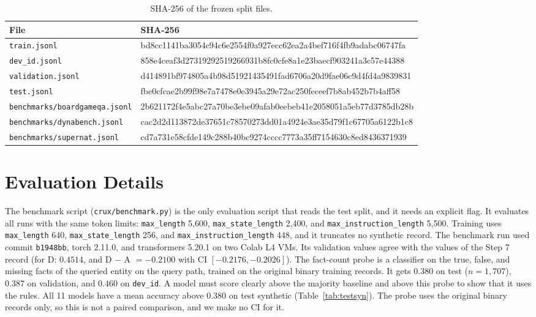 \documentclass[11pt,a4paper]{article}
\newcommand{\hash}[1]{{\ttfamily\scriptsize #1}}
\begin{document}
\begin{table}[h]
\centering
\caption{SHA-256 of the frozen split files.}\label{tab:hash}
\begin{tabular}{ll}
\toprule
File & SHA-256 \\
\midrule
\texttt{train.jsonl} & \hash{bd8cc1141ba3054c94c6e2554f0a927ecc62ea2a4bef716f4fb9adabc06747fa} \\
\texttt{dev\_id.jsonl} & \hash{858e4ceaf3d27319292519266931b8fc0cfe8a1e23baecf903241a3c57e44388} \\
\texttt{validation.jsonl} & \hash{d414891bf974805a4b98d51921435491fad6706a20d9fae06c9d4fd4a9839831} \\
\texttt{test.jsonl} & \hash{fbe0cfcae2b99f98e7a7478e0e3945a29e72ac250feceef7b8ab452b7b4aff58} \\
\texttt{benchmarks/boardgameqa.jsonl} & \hash{2b621172f4e5abc27a70be3ebe09afab0eebeb41e2058051a5eb77d3785db28b} \\
\texttt{benchmarks/dynabench.jsonl} & \hash{cac2d2d113872de37651c78570273dd01a4924e3ae35d79f1c67705a6122b1c8} \\
\texttt{benchmarks/supernat.jsonl} & \hash{cd7a731e58cfde149c288b40bc9274cccc7773a35ff7154630c8ed8436371939} \\
\bottomrule
\end{tabular}
\end{table}

\section{Evaluation Details}\label{app:repro}

The benchmark script (\texttt{crux/benchmark.py}) is the only evaluation script that reads the test split, and it needs an explicit flag.
It evaluates all runs with the same token limits: \texttt{max\_length} 5{,}600, \texttt{max\_state\_length} 2{,}400, and \texttt{max\_instruction\_length} 5{,}500.
Training uses \texttt{max\_length} 640, \texttt{max\_state\_length} 256, and \texttt{max\_instruction\_length} 448, and it truncates no synthetic record.
The benchmark run used commit \texttt{b1948bb}, torch 2.11.0, and transformers 5.20.1 on two Colab L4 VMs.
Its validation values agree with the values of the Step 7 record (for D: $0.4514$, and D $-$ A $= -0.2100$ with CI $[-0.2176, -0.2026]$).
The fact-count probe is a classifier on the true, false, and missing facts of the queried entity on the query path, trained on the original binary training records.
It gets $0.380$ on test ($n = 1{,}707$), $0.387$ on validation, and $0.460$ on \texttt{dev\_id}.
A model must score clearly above the majority baseline and above this probe to show that it uses the rules.
All 11 models have a mean accuracy above $0.380$ on test synthetic (Table~\ref{tab:testsyn}).
The probe uses the original binary records only, so this is not a paired comparison, and we make no CI for it.
\end{document}
